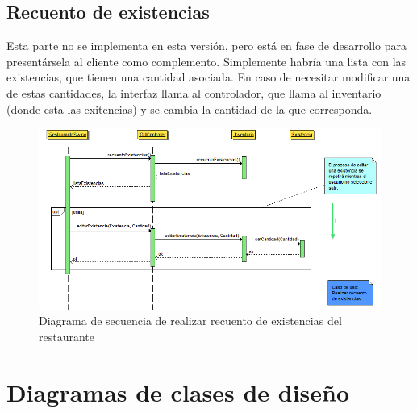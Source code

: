 \documentclass[spanish,a4paper,11pt, twoside]{report}	%
\begin{document}
		\subsection{Recuento de existencias}
		Esta parte no se implementa en esta versión, pero está en fase de desarrollo para presentársela al cliente como complemento. Simplemente habría una lista con las existencias, que tienen una cantidad asociada. En caso de necesitar modificar una de estas cantidades, la interfaz llama al controlador, que llama al inventario (donde esta las exitencias) y se cambia la cantidad de la que corresponda.
		\begin{figure}[!h]
		\centering
		\includegraphics[scale=0.5]{DSexistencias.png}
		\caption{Diagrama de secuencia de realizar recuento de existencias del restaurante}
		\end{figure}



	\section{Diagramas de clases de diseño}
\end{document}
